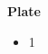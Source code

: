 \documentclass{article}
\begin{document}
\begin{multicols*}{2}
  \noindent\textbf{Plate}
  \begin{itemize}
    \item 1
  \end{itemize}

\end{multicols*}
\end{document}
